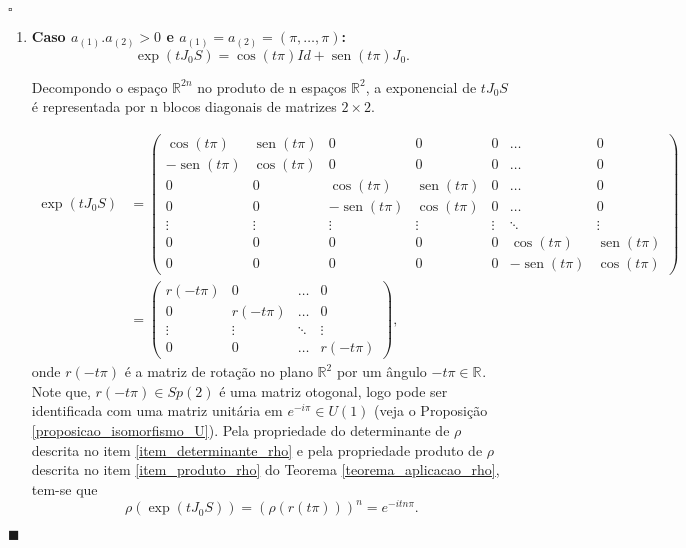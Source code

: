 \documentclass[12pt]{book}
\newenvironment{prova}[1]{$\square$ #1}{\hfill$\blacksquare$}
\DeclareMathOperator{\sen}{sen}
\newcommand{\estruturacomplexa}{J_{0}}
\newcommand{\gruposimpletico}[1]{Sp(#1)}
\newcommand{\real}[1]{\mathbb{R}^{#1}}
\newcommand{\reta}{\real{}}
\begin{document}
\begin{prova}
\begin{enumerate}
			\begin{enumerate}
				\item \textbf{Caso $a_{(1)}.a_{(2)}>0$ e $a_{(1)} = a_{(2)} = (\pi,\dots,\pi)$:}
				$$
				\exp(t\estruturacomplexa S) 
				= 
				\cos(t\pi)Id+ \sen(t\pi)\estruturacomplexa.
				$$
				
				Decompondo o espaço $\real{2n}$ no produto de n espaços $\real{2}$, a exponencial de $t\estruturacomplexa S$ é representada por n blocos diagonais de matrizes $2\times 2$.
				
				$$
				\begin{aligned}
				\exp(t\estruturacomplexa S) 
				&=
				\left(
				\begin{array}{ccccccc}
				\cos(t\pi) & \sen(t\pi) & 0 & 0 & 0 & \dots & 0
				\\
				-\sen(t\pi) & \cos(t\pi) & 0 & 0 & 0 & \dots & 0  
				\\
				0 & 0 & \cos(t\pi) & \sen(t\pi) & 0 & \dots & 0
				\\
				0 & 0 & -\sen(t\pi) & \cos(t\pi) & 0 & \dots & 0
				\\
				\vdots & \vdots & \vdots & \vdots & \vdots & \ddots & \vdots
				\\
				0 & 0 & 0 & 0 & 0 & \cos(t\pi) & \sen(t\pi)
				\\
				0 & 0 & 0 & 0 & 0 & -\sen(t\pi) & \cos(t\pi)
				\end{array}
				\right)
				\\
				&=
				\left(
				\begin{array}{ccccc}
				r(-t\pi) & 0 &\dots & 0 
				\\
				0 & r(-t\pi) &\dots & 0 
				\\
				\vdots & \vdots & \ddots & \vdots 
				\\
				0 & 0 & \dots & r(-t\pi)
				\end{array}
				\right),
				\end{aligned}
				$$
				onde $r(-t\pi)$ é a matriz de rotação no plano $\real{2}$ por um ângulo $-t\pi \in \reta$. Note que, $r(-t\pi) \in \gruposimpletico{2}$ é uma matriz otogonal, logo pode ser identificada com uma matriz unitária em $e^{-i\pi}\in U(1)$ (veja o Proposição \ref{proposicao_isomorfismo_U}). Pela propriedade do determinante de $\rho$ descrita no item \ref{item_determinante_rho} e pela propriedade produto de $\rho$ descrita no item \ref{item_produto_rho} do Teorema \ref{teorema_aplicacao_rho}, tem-se que 
				$$
				\rho(\exp(t\estruturacomplexa S)) = (\rho(r(t\pi)))^{n} = e^{-itn\pi}.
				$$ 
				

\end{enumerate}
\end{enumerate}
\end{prova}
\end{document}
